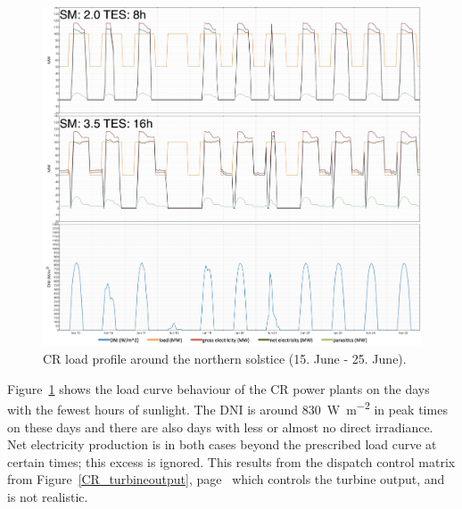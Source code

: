 \begin{figure}[htbp]  
\centering
\includegraphics[width=1\linewidth]{FIG/CR_winter_load}
\caption[CR load profile around the northern solstice (15. June - 25. June).]{CR load profile around the northern solstice (15. June - 25. June).}\label{CR_winter_load}
\end{figure}
Figure~\ref{CR_winter_load} shows the load curve behaviour of the CR power plants on the days with the fewest hours of sunlight. The DNI is around \SI{830}{\watt\per\square\metre} in peak times on these days and there are also days with less or almost no direct irradiance. Net electricity production is in both cases beyond the prescribed load curve at certain times; this excess is ignored. This results from the dispatch control matrix from Figure~\ref{CR_turbineoutput}, page~\pageref{CR_turbineoutput} which controls the turbine output, and is not realistic.


